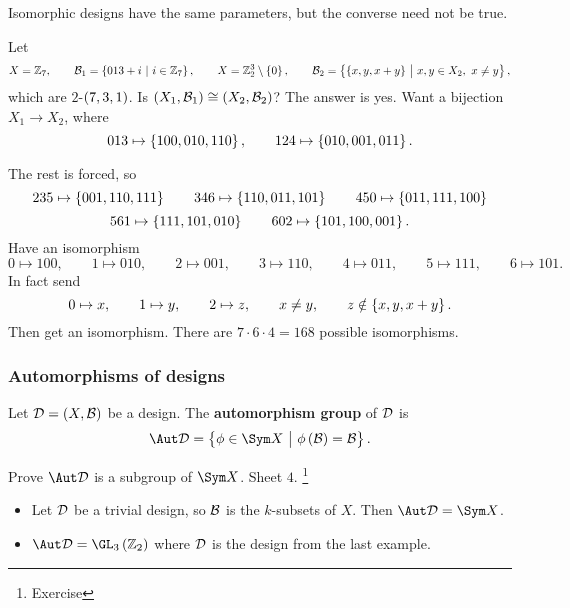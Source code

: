 \begin{note*}
Isomorphic designs have the same parameters, but the converse need not be true.
\end{note*}

\begin{example*}
Let
$$ X = \ZZ_7, \qquad \BBB_1 = \cbr{013 + i \st i \in \ZZ_7}, \qquad X = \ZZ_2^3 \setminus \cbr{0}, \qquad \BBB_2 = \cbr{\cbr{x, y, x + y} \st x, y \in X_2, \ x \ne y}, $$
which are $ 2 $-$ \br{7, 3, 1} $. Is $ \br{X_1, \BBB_1} \cong \br{X_2, \BBB_2} $?
The answer is yes. Want a bijection $ X_1 \to X_2 $, where
$$ 013 \mapsto \cbr{100, 010, 110}, \qquad 124 \mapsto \cbr{010, 001, 011}. $$

\pagebreak

The rest is forced, so
$$ 235 \mapsto \cbr{001, 110, 111} \qquad 346 \mapsto \cbr{110, 011, 101} \qquad 450 \mapsto \cbr{011, 111, 100} $$
$$ 561 \mapsto \cbr{111, 101, 010} \qquad 602 \mapsto \cbr{101, 100, 001}. $$
Have an isomorphism
$$ 0 \mapsto 100, \qquad 1 \mapsto 010, \qquad 2 \mapsto 001, \qquad 3 \mapsto 110, \qquad 4 \mapsto 011, \qquad 5 \mapsto 111, \qquad 6 \mapsto 101. $$
In fact send
$$ 0 \mapsto x, \qquad 1 \mapsto y, \qquad 2 \mapsto z, \qquad x \ne y, \qquad z \notin \cbr{x, y, x + y}. $$
Then get an isomorphism. There are $ 7 \cdot 6 \cdot 4 = 168 $ possible isomorphisms.
\end{example*}

\subsubsection{Automorphisms of designs}

\begin{definition*}
Let $ \DDD = \br{X, \BBB} $ be a design. The \textbf{automorphism group} of $ \mathcal{D} $ is
$$ \Aut \DDD = \cbr{\phi \in \Sym X \st \phi\br{\BBB} = \BBB}. $$
\end{definition*}

Prove $ \Aut \DDD $ is a subgroup of $ \Sym X $. Sheet $ 4 $. \footnote{Exercise}

\begin{example*}
\hfill
\begin{itemize}
\item Let $ \mathcal{D} $ be a trivial design, so $ \mathcal{B} $ is the $ k $-subsets of $ X $. Then $ \Aut \DDD = \Sym X $.
\item $ \Aut \DDD = \GL_3\br{\ZZ_2} $ where $ \mathcal{D} $ is the design from the last example.
\end{itemize}
\end{example*}

